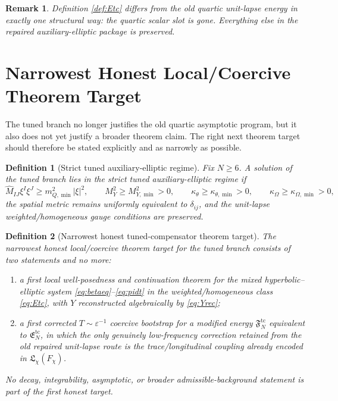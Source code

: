 \documentclass[11pt]{article}
\newtheorem{definition}{Definition}
\newtheorem{remark}{Remark}
\begin{document}
\begin{remark}
Definition \ref{def:Etc} differs from the old quartic unit-lapse energy in exactly one structural way: the quartic scalar slot is gone. Everything else in the repaired auxiliary-elliptic package is preserved.
\end{remark}

\section{Narrowest Honest Local/Coercive Theorem Target}

The tuned branch no longer justifies the old quartic asymptotic program, but it also does not yet justify a broader theorem claim. The right next theorem target should therefore be stated explicitly and as narrowly as possible.

\begin{definition}[Strict tuned auxiliary-elliptic regime]
\label{def:strict}
Fix \(N\ge 6\). A solution of the tuned branch lies in the \emph{strict tuned auxiliary-elliptic regime} if
\begin{equation}
\widehat M_{IJ}\xi^I\xi^J\ge m_{Q,\min}^2|\xi|^2,
\qquad
M_Y^2\ge M_{Y,\min}^2>0,
\qquad
\kappa_\theta\ge \kappa_{\theta,\min}>0,
\qquad
\kappa_\Omega\ge \kappa_{\Omega,\min}>0,
\label{eq:strict}
\end{equation}
the spatial metric remains uniformly equivalent to \(\delta_{ij}\), and the unit-lapse weighted/homogeneous gauge conditions are preserved.
\end{definition}

\begin{definition}[Narrowest honest tuned-compensator theorem target]
\label{def:target}
The \emph{narrowest honest local/coercive theorem target} for the tuned branch consists of two statements and no more:
\begin{enumerate}
    \item a first local well-posedness and continuation theorem for the mixed hyperbolic--elliptic system \eqref{eq:betaeq}--\eqref{eq:pidt} in the weighted/homogeneous class \eqref{eq:Etc}, with \(Y\) reconstructed algebraically by \eqref{eq:Yrec};
    \item a first corrected \(T\sim \varepsilon^{-1}\) coercive bootstrap for a modified energy \(\mathfrak F_N^{\mathrm{tc}}\) equivalent to \(\mathfrak E_N^{\mathrm{tc}}\), in which the only genuinely low-frequency correction retained from the old repaired unit-lapse route is the trace/longitudinal coupling already encoded in \(\mathfrak L_\chi(F_\chi)\).
\end{enumerate}
No decay, integrability, asymptotic, or broader admissible-background statement is part of the first honest target.
\end{definition}
\end{document}
